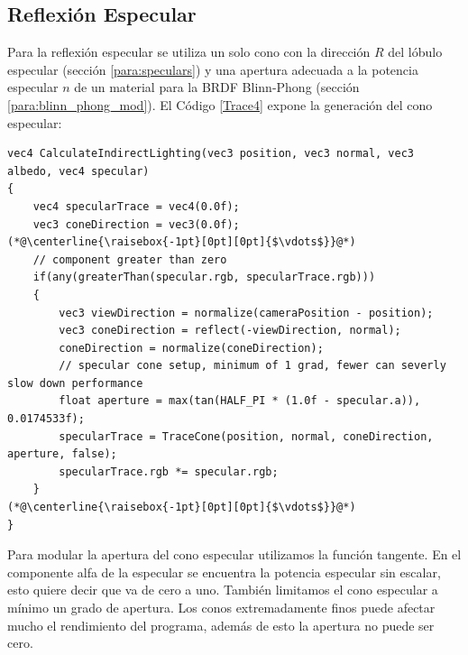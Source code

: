 \subsection{Reflexión Especular} %
\label{sub:reflexion_especular}
Para la reflexión especular se utiliza un solo cono con la dirección $R$ del lóbulo especular (sección \ref{para:speculars}) y una apertura adecuada a la potencia especular $n$ de un material para la \ac{BRDF} Blinn-Phong (sección \ref{para:blinn_phong_mod}). El Código \ref{Trace4} expone la generación del cono especular:
\\
\begin{lstlisting}[caption={Cono para reflexión especular.}, label=Trace4]
vec4 CalculateIndirectLighting(vec3 position, vec3 normal, vec3 albedo, vec4 specular)
{
    vec4 specularTrace = vec4(0.0f);
    vec3 coneDirection = vec3(0.0f);
(*@\centerline{\raisebox{-1pt}[0pt][0pt]{$\vdots$}}@*)
    // component greater than zero
    if(any(greaterThan(specular.rgb, specularTrace.rgb)))
    {
        vec3 viewDirection = normalize(cameraPosition - position);
        vec3 coneDirection = reflect(-viewDirection, normal);
        coneDirection = normalize(coneDirection);
        // specular cone setup, minimum of 1 grad, fewer can severly slow down performance
        float aperture = max(tan(HALF_PI * (1.0f - specular.a)), 0.0174533f);
        specularTrace = TraceCone(position, normal, coneDirection, aperture, false);
        specularTrace.rgb *= specular.rgb;
    }
(*@\centerline{\raisebox{-1pt}[0pt][0pt]{$\vdots$}}@*)
}
\end{lstlisting}
Para modular la apertura del cono especular utilizamos la función tangente. En el componente alfa de la especular se encuentra la potencia especular sin escalar, esto quiere decir que va de cero a uno. También limitamos el cono especular a mínimo un grado de apertura. Los conos extremadamente finos puede afectar mucho el rendimiento del programa, además de esto la apertura no puede ser cero.
